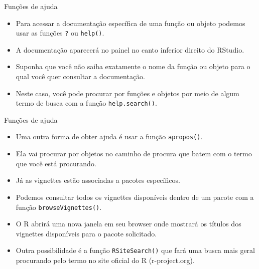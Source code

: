 \documentclass[
  ignorenonframetext,
  serif,
  professionalfont,
  usenames,
  dvipsnames,
  aspectratio = 169]{beamer}
\begin{document}
\begin{frame}[fragile]{Funções de ajuda}
\label{funuxe7uxf5es-de-ajuda-2}
\begin{itemize}
\item
  Para acessar a documentação específica de uma função ou objeto podemos
  usar as funções \texttt{?} ou \texttt{help()}.
\item
  A documentação aparecerá no painel no canto inferior direito do
  RStudio.
\item
  Suponha que você não saiba exatamente o nome da função ou objeto para
  o qual você quer consultar a documentação.
\item
  Neste caso, você pode procurar por funções e objetos por meio de algum
  termo de busca com a função \texttt{help.search()}.
\end{itemize}
\end{frame}

\begin{frame}[fragile]{Funções de ajuda}
\label{funuxe7uxf5es-de-ajuda-3}
\begin{itemize}
\item
  Uma outra forma de obter ajuda é usar a função \texttt{apropos()}.
\item
  Ela vai procurar por objetos no caminho de procura que batem com o
  termo que você está procurando.
\item
  Já as vignettes estão associadas a pacotes específicos.
\item
  Podemos consultar todos os vignettes disponíveis dentro de um pacote
  com a função \texttt{browseVignettes()}.
\item
  O R abrirá uma nova janela em seu browser onde mostrará os títulos dos
  vignettes disponíveis para o pacote solicitado.
\item
  Outra possibilidade é a função \texttt{RSiteSearch()} que fará uma
  busca mais geral procurando pelo termo no site oficial do R
  (r-project.org).
\end{itemize}
\end{frame}
\end{document}
